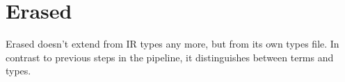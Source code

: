 \documentclass[acmsmall]{acmart}
\numberwithin{figure}{subsection}
\begin{document}

\section{Erased}






Erased doesn't extend from IR types any more, but from its own types file. In contrast to previous steps in the pipeline, it distinguishes between terms and types.

\end{document}
